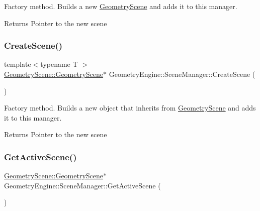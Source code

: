 Factory method. Builds a new \mbox{\hyperlink{namespace_geometry_engine_1_1_geometry_scene}{Geometry\+Scene}} and adds it to this manager. \begin{DoxyReturn}{Returns}
Pointer to the new scene 
\end{DoxyReturn}
\mbox{\label{class_geometry_engine_1_1_scene_manager_acccb8a2f57b58cc96f77c7316b99248e}} 
\subsubsection{\texorpdfstring{CreateScene()}{CreateScene()}\hspace{0.1cm}{\footnotesize\ttfamily [2/2]}}
{\footnotesize\ttfamily template$<$typename T $>$ \\
\mbox{\hyperlink{class_geometry_engine_1_1_geometry_scene_1_1_geometry_scene}{Geometry\+Scene\+::\+Geometry\+Scene}}$\ast$ Geometry\+Engine\+::\+Scene\+Manager\+::\+Create\+Scene (\begin{DoxyParamCaption}{ }\end{DoxyParamCaption})\hspace{0.3cm}{\ttfamily [inline]}}

Factory method. Builds a new object that inherits from \mbox{\hyperlink{namespace_geometry_engine_1_1_geometry_scene}{Geometry\+Scene}} and adds it to this manager. \begin{DoxyReturn}{Returns}
Pointer to the new scene 
\end{DoxyReturn}
\mbox{\label{class_geometry_engine_1_1_scene_manager_a8d9620773e7ee65a82aa13bb4a1a1fdf}} 
\subsubsection{\texorpdfstring{GetActiveScene()}{GetActiveScene()}}
{\footnotesize\ttfamily \mbox{\hyperlink{class_geometry_engine_1_1_geometry_scene_1_1_geometry_scene}{Geometry\+Scene\+::\+Geometry\+Scene}}$\ast$ Geometry\+Engine\+::\+Scene\+Manager\+::\+Get\+Active\+Scene (\begin{DoxyParamCaption}{ }\end{DoxyParamCaption})\hspace{0.3cm}{\ttfamily [inline]}}

